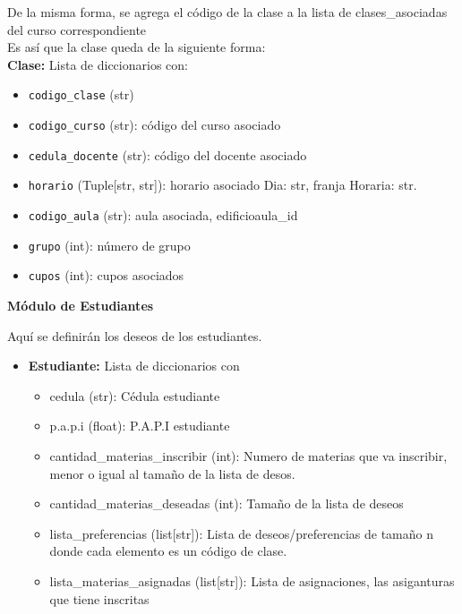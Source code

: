 \documentclass{article}
\begin{document}
\begin{enumerate}
        De la misma forma, se agrega el código de la clase a la lista de clases\_asociadas 
        del curso correspondiente\\

        Es así que la clase queda de la siguiente forma:\\

        \textbf{Clase:} Lista de diccionarios con:
        \begin{itemize}
          \item \texttt{codigo\_clase} (str)
          \item \texttt{codigo\_curso} (str): código del curso asociado
          \item \texttt{cedula\_docente} (str): código del docente asociado
          \item \texttt{horario} (Tuple[str, str]): horario asociado Dia: str, franja Horaria: str.
          \item \texttt{codigo\_aula} (str): aula asociada, edificio\+aula\_id
          \item \texttt{grupo} (int): número de grupo
          \item \texttt{cupos} (int): cupos asociados
        \end{itemize}
\end{enumerate}



\textbf{Módulo de Estudiantes}

Aquí se definirán los deseos de los estudiantes.

\begin{itemize}
  \item \textbf{Estudiante:} Lista de diccionarios con
        \begin{itemize}
          \item cedula (str): Cédula estudiante
          \item p.a.p.i (float): P.A.P.I estudiante 
          \item cantidad\_materias\_inscribir (int): 
                Numero de materias que va inscribir, menor o igual al tamaño
                de la lista de desos.
          \item cantidad\_materias\_deseadas (int): Tamaño de la lista de deseos
          \item lista\_preferencias (list[str]): Lista de deseos/preferencias de tamaño 
                n donde cada elemento es un 
                código de clase.
          \item lista\_materias\_asignadas (list[str]): Lista de asignaciones, las 
                asiganturas que tiene inscritas
        \end{itemize}
\end{itemize}
\end{document}
